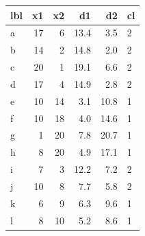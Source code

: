 \documentclass[a4paper]{article}\usepackage[]{graphicx}\usepackage[]{xcolor}
\begin{document}
\begin{minipage}[t]{0.49\textwidth}
\centering
\begin{Schunk}

\begin{tabular}{lrr>{}r>{}r>{}l}
\toprule
lbl & x1 & x2 & d1 & d2 & cl\\
\midrule
a & 17 & 6 & \textcolor{myblue}{13.4} & \textcolor{myblue}{3.5} & \textcolor{myblue}{2}\\
b & 14 & 2 & \textcolor{myblue}{14.8} & \textcolor{myblue}{2.0} & \textcolor{myblue}{2}\\
c & 20 & 1 & \textcolor{myblue}{19.1} & \textcolor{myblue}{6.6} & \textcolor{myblue}{2}\\
d & 17 & 4 & \textcolor{myblue}{14.9} & \textcolor{myblue}{2.8} & \textcolor{myblue}{2}\\
e & 10 & 14 & \textcolor{myblue}{3.1} & \textcolor{myblue}{10.8} & \textcolor{myblue}{1}\\
\addlinespace
f & 10 & 18 & \textcolor{myblue}{4.0} & \textcolor{myblue}{14.6} & \textcolor{myblue}{1}\\
g & 1 & 20 & \textcolor{myblue}{7.8} & \textcolor{myblue}{20.7} & \textcolor{myblue}{1}\\
h & 8 & 20 & \textcolor{myblue}{4.9} & \textcolor{myblue}{17.1} & \textcolor{myblue}{1}\\
i & 7 & 3 & \textcolor{myblue}{12.2} & \textcolor{myblue}{7.2} & \textcolor{myblue}{2}\\
j & 10 & 8 & \textcolor{myblue}{7.7} & \textcolor{myblue}{5.8} & \textcolor{myblue}{2}\\
\addlinespace
k & 6 & 9 & \textcolor{myblue}{6.3} & \textcolor{myblue}{9.6} & \textcolor{myblue}{1}\\
l & 8 & 10 & \textcolor{myblue}{5.2} & \textcolor{myblue}{8.6} & \textcolor{myblue}{1}\\
\bottomrule
\end{tabular}

\end{Schunk}
\end{minipage}
\end{document}
